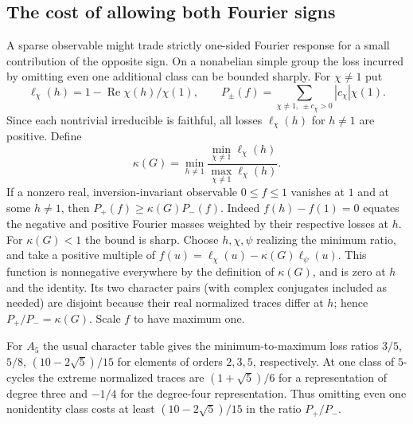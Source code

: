 \subsection*{The cost of allowing both Fourier signs}
A sparse observable might trade strictly one-sided Fourier response for a small contribution of the opposite sign. On a nonabelian simple group the loss incurred by omitting even one additional class can be bounded sharply. For $\chi\ne1$ put
\[
 \ell_\chi(h)=1-\operatorname{Re}\chi(h)/\chi(1),\qquad
 P_\pm(f)=\sum_{\chi\ne1,\ \pm c_\chi>0}|c_\chi|\chi(1).
\]
Since each nontrivial irreducible is faithful, all losses $\ell_\chi(h)$ for $h\ne1$ are positive. Define
\[
 \kappa(G)=\min_{h\ne1}
 \frac{\min_{\chi\ne1}\ell_\chi(h)}{\max_{\chi\ne1}\ell_\chi(h)}.
\]
If a nonzero real, inversion-invariant observable $0\le f\le1$ vanishes at $1$ and at some $h\ne1$, then $P_+(f)\ge\kappa(G)P_-(f)$. Indeed $f(h)-f(1)=0$ equates the negative and positive Fourier masses weighted by their respective losses at $h$. For $\kappa(G)<1$ the bound is sharp. Choose $h,\chi,\psi$ realizing the minimum ratio, and take a positive multiple of $f(u)=\ell_\chi(u)-\kappa(G)\ell_\psi(u)$. This function is nonnegative everywhere by the definition of $\kappa(G)$, and is zero at $h$ and the identity. Its two character pairs (with complex conjugates included as needed) are disjoint because their real normalized traces differ at $h$; hence $P_+/P_-=\kappa(G)$. Scale $f$ to have maximum one.

For $A_5$ the usual character table gives the minimum-to-maximum loss ratios $3/5$, $5/8$, $(10-2\sqrt5)/15$ for elements of orders $2,3,5$, respectively. At one class of $5$-cycles the extreme normalized traces are $(1+\sqrt5)/6$ for a representation of degree three and $-1/4$ for the degree-four representation. Thus omitting even one nonidentity class costs at least $(10-2\sqrt5)/15$ in the ratio $P_+/P_-$.

